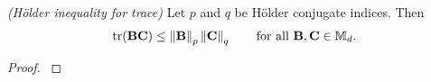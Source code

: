 \begin{proposition}
  \emph{(Hölder inequality for trace)}
  Let 
  $p$ and $q$
  be Hölder conjugate indices.
  Then
  \begin{gather}
    \mathrm{tr}
    (
    \mathbf{BC}
    )
    \le
    \norm{\mathbf{B}}_p
    \norm{\mathbf{C}}_q
    \qquad
    \text{for all}
    \ 
    \mathbf{B}
    ,
    \mathbf{C}
    \in 
    \mathbb{M}_d
    .
  \end{gather}
\end{proposition}
\begin{proof}
  \cite[Corollary~IV.2.6]{Bhatia1997}
\end{proof}
